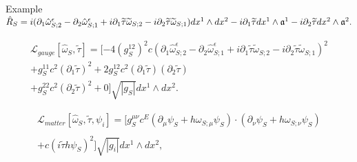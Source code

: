 \begin{frame}{Example}
    $\hat R_S = i(\partial_{1} \hat \omega^\epsilon_{S;2} - \partial_{2} \hat \omega^\epsilon_{S; 1} + i \partial_1 \tilde \tau \tilde \omega_{S; 2} - i \partial_2 \tilde \tau \tilde \omega_{S; 1}) dx^1 \wedge dx^2 
    - i \partial_{1} \tilde \tau dx^1 \wedge \alg a^1 
    -  i \partial_{2} \tilde \tau dx^2 \wedge \alg a^2.$
    
    \begin{multline}
    \mathcal L_{gauge}[\hat \omega_S, \tilde \tau] = [-4(g_S^{12})^2 c (\partial_{1} \hat \omega^\epsilon_{S;2} - \partial_{2} \hat \omega^\epsilon_{S;1} + i \partial_1 \tilde \tau \tilde \omega_{S; 2} - i \partial_2 \tilde \tau \tilde \omega_{S; 1})^2 \\ + 
        g_S^{11} c^2 (\partial_1 \tilde \tau)^2 + 2g_S^{12} c^2 (\partial_1 \tilde \tau)(\partial_2 \tilde \tau) \\ + g_S^{22} c^2 (\partial_2 \tilde \tau)^2
        +0] \sqrt{|g_S|}dx^1 \wedge dx^2.
\end{multline}

\begin{multline}
    \mathcal L_{matter}[\hat \omega_S, \tilde \tau, \psi_i] =
    [g_S^{\mu \nu} c^E (\partial_\mu \psi_S + h \omega_{S; \mu}  \psi_S)\cdot(\partial_\nu \psi_S + h \omega_{S; \nu}  \psi_S) \\
    \\+ c(i \tilde \tau h \psi_S)^2] \sqrt{|g_i|}dx^1 \wedge  dx^2,
\end{multline}
\end{frame}